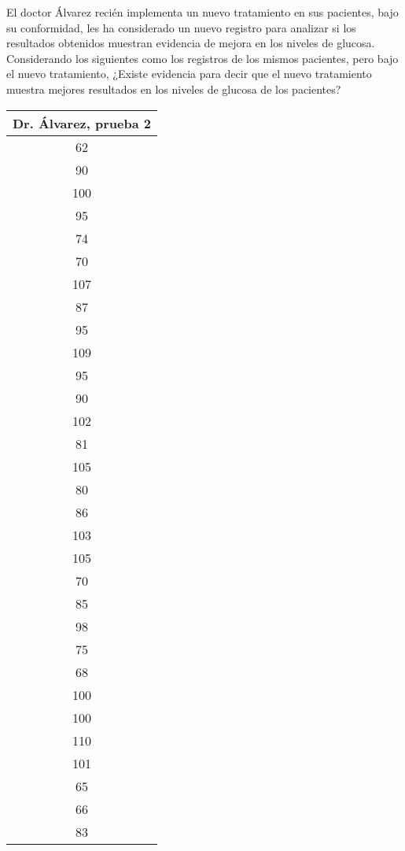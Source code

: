 \documentclass[12pt]{article}
\newenvironment{problem}[2][Problema]{\begin{trivlist}
\item[\hskip \labelsep {\bfseries #1}\hskip \labelsep {\bfseries #2.}]}{\end{trivlist}}
\begin{document}
\begin{problem}{E}
El doctor Álvarez recién implementa un nuevo tratamiento en sus pacientes, bajo su conformidad, les ha considerado un nuevo registro para analizar si los resultados obtenidos muestran evidencia de mejora en los niveles de glucosa. Considerando los siguientes como los registros de los mismos pacientes, pero bajo el nuevo tratamiento, ¿Existe evidencia para decir que el nuevo tratamiento muestra mejores resultados en los niveles de glucosa de los pacientes?
\begin{table}[h!]
\centering
\begin{tabular}{|c|}
\hline
\textbf{Dr. Álvarez, prueba 2} \\ \hline
62  \\ \hline
90  \\ \hline
100 \\ \hline
95  \\ \hline
74  \\ \hline
70  \\ \hline
107 \\ \hline
87  \\ \hline
95  \\ \hline
109 \\ \hline
95  \\ \hline
90  \\ \hline
102 \\ \hline
81  \\ \hline
105 \\ \hline
80  \\ \hline
86  \\ \hline
103 \\ \hline
105 \\ \hline
70  \\ \hline
85  \\ \hline
98  \\ \hline
75  \\ \hline
68  \\ \hline
100 \\ \hline
100 \\ \hline
110 \\ \hline
101 \\ \hline
65  \\ \hline
66  \\ \hline
83  \\ \hline
\end{tabular}
\label{tab:dr_alvarez_scores}
\end{table}
\end{problem}
\end{document}
